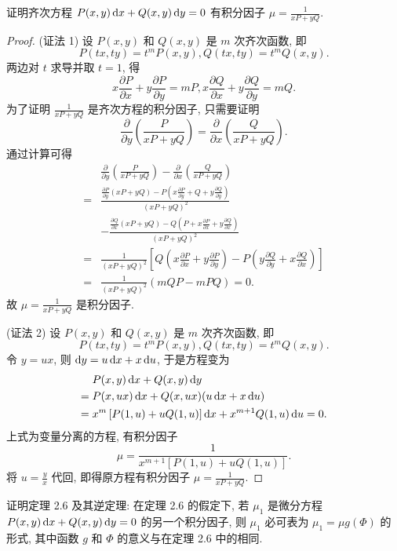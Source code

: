 \begin{exercise}
  证明齐次方程 $P(x,y)\mathop{}\!\mathrm{d} x+Q(x,y)\mathop{}\!\mathrm{d} y=0$ 有积分因子 $\mu=\frac{1}{xP+yQ}$.  
\end{exercise}

\begin{proof}
  (证法 1) 设 $P(x,y)$ 和 $Q(x,y)$ 是 $m$ 次齐次函数, 即
  \[P (tx,ty)=t^mP(x,y),Q(tx,ty)=t^mQ(x,y).\]
  两边对 $t$ 求导并取 $t=1$, 得
  \[x\frac{\partial P}{\partial x}+y\frac{\partial P}{\partial y}
    = mP,x\frac{\partial Q}{\partial x}+y\frac{\partial Q}{\partial y}=mQ.\]
  为了证明 $\frac{1}{xP+yQ}$ 是齐次方程的积分因子, 只需要证明
  \[\frac{\partial}{\partial y}\left(\frac{P}{xP+yQ}\right)
    = \frac{\partial}{\partial x}\left(\frac{Q}{xP+yQ}\right).\]
  通过计算可得
  \[\begin{split}
  &\frac{\partial}{\partial y}\left(\frac{P}{xP+yQ}\right)-\frac{\partial}{\partial x}\left(\frac{Q}{xP+yQ}\right)\\
  =&\frac{\frac{\partial P}{\partial y}(xP+yQ)-P\left(x\frac{\partial P}{\partial y}+Q+y\frac{\partial Q}{\partial y}\right)}{(xP+yQ)^2}\\
  &-\frac{\frac{\partial Q}{\partial x}(xP+yQ)-Q\left(P+x\frac{\partial P}{\partial x}+y\frac{\partial Q}{\partial x}\right)}{(xP+yQ)^2}\\
  =&\frac{1}{(xP+yQ)^2}\left[Q\left(x\frac{\partial P}{\partial x}+y\frac{\partial P}{\partial y}\right)-P\left(y\frac{\partial Q}{\partial y}+x\frac{\partial Q}{\partial x}\right)\right]\\
  =&\frac{1}{(xP+yQ)^2}(mQP-mPQ)=0.
  \end{split}\]
  故 $\mu=\frac{1}{xP+yQ}$ 是积分因子.

  (证法 2) 设 $P(x,y)$ 和 $Q(x,y)$ 是 $m$ 次齐次函数, 即
  \[P(tx,ty)=t^mP(x,y),Q(tx,ty)=t^mQ(x,y).\]
  令 $y=ux$, 则 $\mathop{}\!\mathrm{d} y=u\mathop{}\!\mathrm{d} x+x\mathop{}\!\mathrm{d} u$, 于是方程变为
  \[\begin{split}
        & P(x,y)\mathop{}\!\mathrm{d} x+Q(x,y)\mathop{}\!\mathrm{d} y \\
    ={} & P(x,ux)\mathop{}\!\mathrm{d} x+Q(x,ux)(u\mathop{}\!\mathrm{d} x+x\mathop{}\!\mathrm{d} u) \\
    ={} & x^m\left[P(1,u)+uQ(1,u)\right]\mathop{}\!\mathrm{d} x+x^{m+1}Q(1,u)\mathop{}\!\mathrm{d} u=0.
  \end{split}\]
  上式为变量分离的方程, 有积分因子
  \[\mu=\frac{1}{x^{m+1}[P(1,u)+uQ(1,u)]}.\]
  将 $u=\frac{y}{x}$ 代回, 即得原方程有积分因子 $\mu=\frac{1}{xP+yQ}$.
\end{proof}



\begin{exercise}
  证明定理 2.6 及其逆定理: 在定理 2.6 的假定下,
  若 $\mu_1$ 是微分方程 $P(x,y)\mathop{}\!\mathrm{d} x+Q(x,y)\mathop{}\!\mathrm{d} y=0$ 的另一个积分因子,
  则 $\mu_1$ 必可表为 $\mu_1=\mu g(\varPhi)$ 的形式, 其中函数 $g$ 和 $\varPhi$ 的意义与在定理 2.6 中的相同.
\end{exercise}

